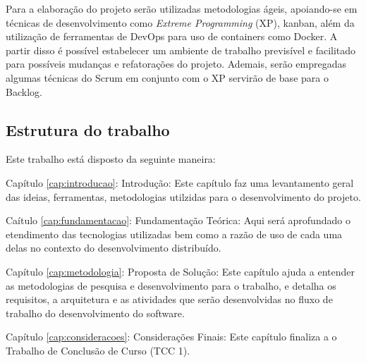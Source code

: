 Para a elaboração do projeto serão utilizadas metodologias ágeis, apoiando-se em técnicas de desenvolvimento como \textit{Extreme Programming} (XP), kanban, além da utilização de ferramentas de DevOps para uso de containers como Docker. A partir disso é possível estabelecer um ambiente de trabalho previsível e facilitado para possíveis mudanças e refatorações do projeto. Ademais, serão empregadas algumas técnicas do Scrum em conjunto com o XP servirão de base para o Backlog.

\subsection{Estrutura do trabalho}

Este trabalho está disposto da seguinte maneira:

Capítulo \ref{cap:introducao}: Introdução: Este capítulo faz uma levantamento geral das ideias, ferramentas, metodologias utilzidas para o desenvolvimento do projeto.

Caítulo \ref{cap:fundamentacao}: Fundamentação Teórica: Aqui será aprofundado o etendimento das tecnologias utilizadas bem como a razão de uso de cada uma delas no contexto do desenvolvimento distribuído.

Capítulo \ref{cap:metodologia}: Proposta de Solução: Este capítulo ajuda a entender as metodologias de pesquisa e desenvolvimento para o trabalho, e detalha os requisitos, a arquitetura e as atividades que serão desenvolvidas no fluxo de trabalho do desenvolvimento do software.

Capítulo \ref{cap:consideracoes}: Considerações Finais: Este capítulo finaliza a o Trabalho de Conclusão de Curso (TCC 1).
